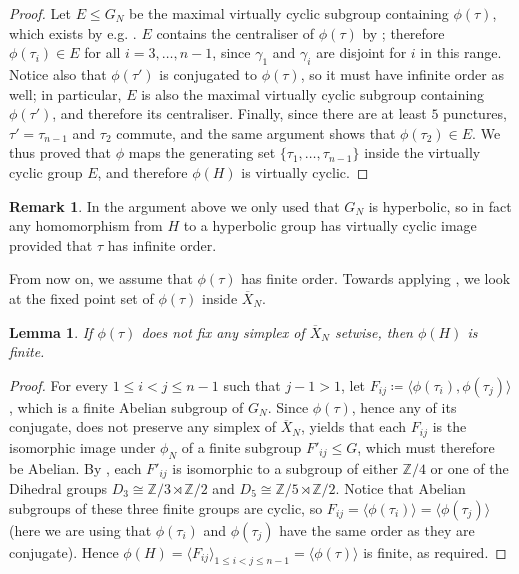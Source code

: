 \documentclass[svgnames]{amsart}
\theoremstyle{plain}
\newtheorem{lem}[thm]{Lemma}
\theoremstyle{definition}
\newtheorem{rem}[thm]{Remark}
\newcommand{\Z}{\mathbb{Z}}
\newcommand{\ov}[1]{\overline{#1}}
\begin{document}
    \begin{proof}
        Let $E\le G_N$ be the maximal virtually cyclic subgroup containing $\phi(\tau)$, which exists by e.g. \cite[Lemma 6.5]{DGO}. $E$ contains the centraliser of $\phi(\tau)$ by \cite[Corollary 6.6]{DGO}; therefore $\phi(\tau_i)\in E$ for all $i=3,\ldots, n-1$, since $\gamma_1$ and $\gamma_i$ are disjoint for $i$ in this range. Notice also that $\phi(\tau')$ is conjugated to $\phi(\tau)$, so it must have infinite order as well; in particular, $E$ is also the maximal virtually cyclic subgroup containing $\phi(\tau')$, and therefore its centraliser. Finally, since there are at least $5$ punctures, $\tau'=\tau_{n-1}$ and $\tau_2$ commute, and the same argument shows that $\phi(\tau_2)\in E$. We thus proved that $\phi$ maps the generating set $\{\tau_1,\ldots, \tau_{n-1}\}$ inside the virtually cyclic group $E$, and therefore $\phi(H)$ is virtually cyclic.
    \end{proof}

    \begin{rem}
        In the argument above we only used that $G_N$ is hyperbolic, so in fact any homomorphism from $H$ to a hyperbolic group has virtually cyclic image provided that $\tau$ has infinite order.
    \end{rem}

    \noindent From now on, we assume that $\phi(\tau)$ has finite order. Towards applying , we look at the fixed point set of $\phi(\tau)$ inside $\ov X_N$.

    \begin{lem}\label{lem:no_fix}
        If $\phi(\tau)$ does not fix any simplex of $\ov X_N$ setwise, then $\phi(H)$ is finite.
    \end{lem}
    \begin{proof}
        For every $1\le i<j\le n-1$ such that $j-1>1$, let $F_{ij}\coloneq \langle \phi(\tau_i), \phi(\tau_j)\rangle$, which is a finite Abelian subgroup of $G_N$. Since $\phi(\tau)$, hence any of its conjugate, does not preserve any simplex of $\ov X_N$,  yields that each $F_{ij}$ is the isomorphic image under $\phi_N$ of a finite subgroup $F'_{ij}\le G$, which must therefore be Abelian. By \cite[Theorem 3]{Stukow_conj_Class_finite_sgr}, each $F'_{ij}$ is isomorphic to a subgroup of either $\Z/4$ or one of the Dihedral groups $D_3\cong \Z/3 \rtimes \Z/2$ and $D_5\cong \Z/5 \rtimes \Z/2$. Notice that Abelian subgroups of these three finite groups are cyclic, so $F_{ij}=\langle\phi(\tau_i)\rangle=\langle \phi(\tau_j)\rangle$ (here we are using that $\phi(\tau_i)$ and $\phi(\tau_j)$ have the same order as they are conjugate). Hence $\phi(H)=\langle F_{ij}\rangle_{1\le i<j\le n-1}=\langle \phi(\tau)\rangle$ is finite, as required. 
    \end{proof}
\end{document}
